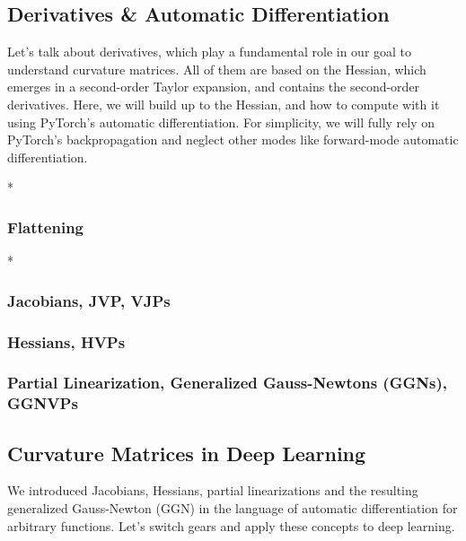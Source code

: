 \subsection{Derivatives \& Automatic Differentiation}\label{subsec:derivatives}
Let's talk about derivatives, which play a fundamental role in our goal to understand curvature matrices.
All of them are based on the Hessian, which emerges in a second-order Taylor expansion, and contains the second-order derivatives.
Here, we will build up to the Hessian, and how to compute with it using PyTorch's automatic differentiation.
For simplicity, we will fully rely on PyTorch's backpropagation and neglect other modes like forward-mode automatic differentiation.

\switchcolumn[0]*
\subsubsection{Flattening}


\switchcolumn[0]*
\subsubsection{Jacobians, JVP, VJPs}


\switchcolumn[0]
\subsubsection{Hessians, HVPs}


\switchcolumn[0]
\subsubsection{Partial Linearization, Generalized Gauss-Newtons (GGNs), GGNVPs}\label{sec:partial_linearization}


\switchcolumn[0]
\subsection{Curvature Matrices in Deep Learning}\label{subsec:curvature-matrices}

We introduced Jacobians, Hessians, partial linearizations and the resulting generalized Gauss-Newton (GGN) in the language of automatic differentiation for arbitrary functions.
Let's switch gears and apply these concepts to deep learning.

